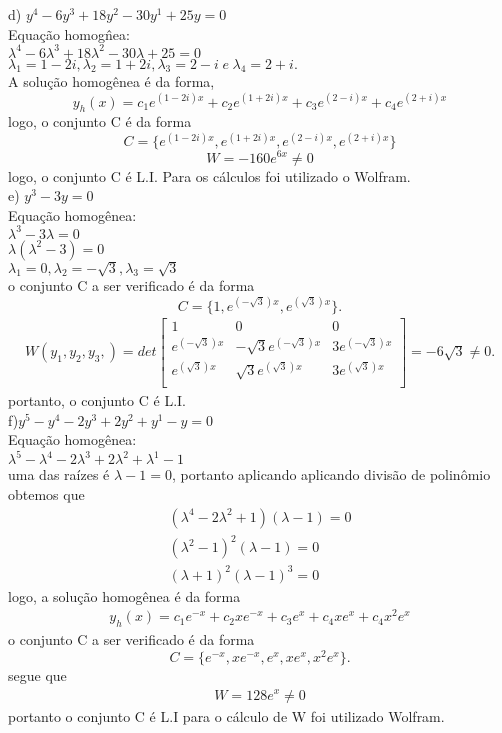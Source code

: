 \documentclass[a4paper,12pt]{article}
\begin{document}
d) $y^{4} -6y^{3} + 18y^{2} -30y^{1} + 25y= 0$ \\ 
Equa\c c\~ao homog\^nea:\\
${\lambda}^{4} -6{\lambda}^{3} + 18{\lambda}^{2} -30{\lambda} + 25= 0$\\
${\lambda}_1 = 1-2i,  {\lambda}_2 = 1+2i, {\lambda}_3 = 2-i \hspace{3pt} e\hspace{3pt} {\lambda}_4 = 2+i.$ \\
A solu\c c\~ao homog\^enea \'e da forma,
$$y_h(x) = c_1e^{(1-2i)x} + c_2e^{(1+2i)x} + c_3e^{(2-i)x} + c_4e^{(2+i)x}$$
logo, o conjunto C \'e da forma 
$$C = \{e^{(1-2i)x},e^{(1+2i)x},e^{(2-i)x},e^{(2+i)x}\}$$
$$W = -160e^{6x} \neq 0$$
logo, o conjunto C \'e L.I. Para os c\'alculos foi utilizado o Wolfram.\\
e) $y^{3} -3y  = 0$\\
Equa\c c\~ao homog\^enea: \\
${\lambda}^{3} -3{\lambda} = 0$\\
${\lambda}({\lambda}^{2} -3) = 0$\\
${\lambda}_1 = 0,{\lambda}_2 = -\sqrt{3},{\lambda}_3 = \sqrt{3}$\\
o conjunto C a ser verificado \'e da forma
$$C = \{1, e^{(-\sqrt{3})x},e^{(\sqrt{3})x}\}.$$
\begin{align*}
	W(y_1,y_2, y_3,) = det \left [ \begin{array}{ccc} 
			1 & 0  & 0\\
			e^{(-\sqrt{3})x} & -\sqrt{3}e^{(-\sqrt{3})x} & 3e^{(-\sqrt{3})x}\\
e^{(\sqrt{3})x} & \sqrt{3}e^{(\sqrt{3})x} & 3e^{(\sqrt{3})x}\\
	\end{array} \right ]= -6\sqrt{3} \neq 0.
\end{align*}
portanto, o conjunto C \'e L.I.\\
f)$y^{5} - y^{4} -2y^{3} + 2y^{2} + y^{1} -y = 0$\\
Equa\c c\~ao homog\^enea:\\
${\lambda}^{5} - {\lambda}^{4} -2{\lambda}^{3} + 2{\lambda}^{2} + {\lambda}^{1} -1$\\
uma das ra\'izes \'e $\lambda -1 = 0$, portanto aplicando  aplicando divis\~ao de polin\^omio obtemos que
\begin{align*}
({\lambda}^{4} -2{\lambda}^{2} + 1) (\lambda -1) = 0\\
({\lambda}^{2} -1)^{2} (\lambda -1) = 0\\
({\lambda} + 1)^{2} (\lambda -1)^{3} = 0
\end{align*}
logo, a solu\c c\~ao homog\^enea \'e da forma
\begin{align*}
	y_h(x) = c_1e^{-x} + c_2xe^{-x} + c_3e^{x} + c_4xe^{x} + c_4{x}^{2}e^{x}
\end{align*}
o conjunto C a ser verificado \'e da forma \\
$$C = \{e^{-x}, xe^{-x},e^{x},xe^{x},{x}^{2}e^{x}\}.$$
segue que 
\begin{align*}
	W = 128 e^{x} \neq  0
\end{align*}
portanto o conjunto C \'e L.I para o c\'alculo de W foi utilizado Wolfram.
\end{document}
